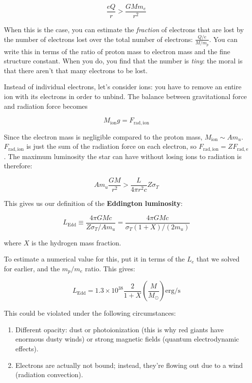 \documentclass[12pt, letterpaper, preprint]{aastex}
\newcommand{\ledd}{L_{\mathrm{Edd}}}
\begin{document}
\begin{enumerate}
$$ \frac{e Q}{r} > \frac{G M m_e} {r^2} $$

When this is the case, you can estimate the \emph{fraction} of electrons that are lost by the number of electrons lost over the total number of electrons: $\frac{Q/e}{M/m_p}$. You can write this in terms of the ratio of proton mass to electron mass and the fine structure constant. When you do, you find that the number is \emph{tiny}: the moral is that there aren't that many electrons to be lost. 

Instead of individual electrons, let's consider ions: you have to remove an entire ion with its electrons in order to unbind. The balance between gravitational force and radiation force becomes

$$ M_{\mathrm{ion}} g = F_{\mathrm{rad, ion}} $$

Since the electron mass is negligible compared to the proton mass, $M_{\mathrm{ion}} \sim A m_u$. $F_{\mathrm{rad, ion}}$ is just the sum of the radiation force on each electron, so $F_{\mathrm{rad, ion}} = Z F_{\mathrm{rad, e}}$. The maximum luminosity the star can have without losing ions to radiation is therefore: 

$$ A m_u \frac{GM}{r^2} > \frac{L}{4 \pi r^2 c} Z \sigma_T $$

This gives us our definition of the \textbf{Eddington luminosity}:

\begin{equation}
\ledd \equiv \frac{4 \pi G M c}{Z \sigma_T / A m_u} = \frac{4 \pi G M c}{\sigma_T (1 + X) / (2 m_u)}
\end{equation}

where $X$ is the hydrogen mass fraction. 

To estimate a numerical value for this, put it in terms of the $L_e$ that we solved for earlier, and the $m_p/m_e$ ratio. This gives:

$$ \ledd = 1.3 \times 10^{38} \frac{2}{1+X} \left( \frac{M}{M_\odot} \right) \mathrm{erg/s} $$

This could be violated under the following circumstances:

\begin{enumerate}
\item Different opacity: dust or photoionization (this is why red giants have enormous dusty winds) or strong magnetic fields (quantum electrodynamic effects).
\item Electrons are actually not bound; instead, they're flowing out due to a wind (radiation convection).
\end{enumerate}


\end{enumerate}
\end{document}
